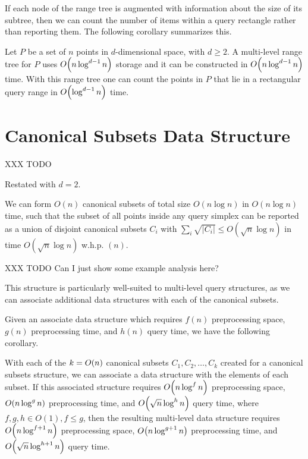 If each node of the range tree is augmented with information about the size of its subtree, then we can count the number of items within a query rectangle rather than reporting them. The following corollary summarizes this.

\begin{corollary}
\label{cor:rangetree}
Let $P$ be a set of $n$ points in $d$-dimensional space, with $d \geq 2$. A multi-level range tree for $P$ uses $O\!\left(n \log^{d-1}{n}\right)$ storage and it can be constructed in $O\!\left(n \log^{d-1}{n}\right)$ time. With this range tree one can count the points in $P$ that lie in a rectangular query range in $O\!\left(\log^{d-1}{n}\right)$ time.
\end{corollary}


\section{Canonical Subsets Data Structure}
\label{:prelim:chan}

XXX TODO

Restated with $d=2$.

\begin{theorem}
\label{th:chan}
We can form $O(n)$ canonical subsets of total size $O(n \log{n})$ in $O(n \log{n})$ time, such that the subset of all points inside any query simplex can be reported as a union of disjoint canonical subsets $C_i$ with $\sum_i{\sqrt{|C_i|}} \leq O(\sqrt{n}\log{n})$ in time $O(\sqrt{n}\log{n})$ w.h.p. $(n)$.
\end{theorem}

XXX TODO Can I just show some example analysis here?

This structure is particularly well-suited to multi-level query structures, as we can associate additional data structures with each of the canonical subsets.

Given an associate data structure which requires $f(n)$ preprocessing space, $g(n)$ preprocessing time, and $h(n)$ query time, we have the following corollary.

\begin{corollary}
\label{cor:chan}
With each of the $k = O\!\left(n\right)$ canonical subsets $C_1, C_2, \ldots, C_k$ created for a canonical subsets structure, we can associate a data structure with the elements of each subset. If this associated structure requires $O\!\left(n\log^f{n}\right)$ preprocessing space, $O\!\left(n \log^g{n}\right)$ preprocessing time, and $O\!\left(\sqrt{n}\log^h{n}\right)$ query time, where $f, g, h \in O(1), f \leq g$, then the resulting multi-level data structure requires $O\!\left(n\log^{f+1}{n}\right)$ preprocessing space, $O\!\left(n\log^{g+1}{n}\right)$ preprocessing time, and $O\!\left(\sqrt{n}\log^{h+1}{n}\right)$ query time.
\end{corollary}

